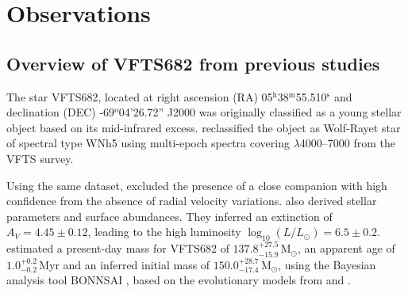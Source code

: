 \documentclass[a4paper,fleqn,usenatbib]{mnras}
\newcommand{\Msun}{{\,\mathrm{M}_\odot}}
\DeclareRobustCommand{\Tabref}[1]{Table~\ref{#1}}
\begin{document}

\section{Observations}
\label{sec:sample}

\subsection{ Overview of VFTS682 from previous studies \label{data:vfts683}}

The star VFTS682, located at right ascension (RA)
05$^\mathrm{h}$38$^\mathrm{m}$55.510$^\mathrm{s}$  and declination
(DEC) \mbox{-69$^\mathrm{o}$04'26.72''} J2000 \citep[][%
]{evans:11}
was originally classified as a young stellar object \citep{gruendl:09}
based on its mid-infrared excess. \citet{evans:11} reclassified the
object as Wolf-Rayet star of spectral type WNh5 using multi-epoch
spectra covering $\lambda$4000--7000 from the
VFTS survey. %

Using the same dataset,
\citet{bestenlehner:11} excluded the presence of a close companion
with high confidence from the absence of radial velocity variations.
\citet{bestenlehner:11} %
also derived stellar
parameters and surface abundances. They inferred an extinction
of $A_V=4.45\pm0.12$, leading to the high luminosity
$\log_{10}(L/L_\odot) =  6.5\pm0.2$. \citet{schneider:18} estimated
a present-day mass for VFTS682 of $137.8^{+27.5}_ {-15.9}\Msun$, an
apparent age of $1.0^{+0.2}_{-0.2}$\,Myr and an inferred initial mass
of $150.0^{+28.7}_{-17.4}\Msun$, using the Bayesian analysis tool BONNSAI
\citep{schneider:17}, based on the evolutionary models from
\citet{brott:11} and \cite{kohler:15}. %
\end{document}
